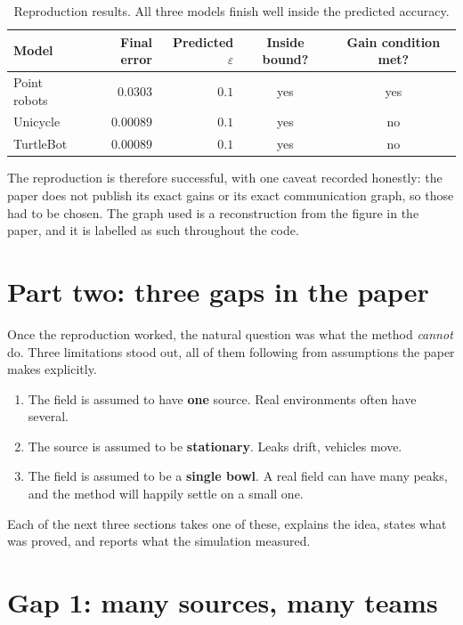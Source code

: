 \documentclass[11pt,a4paper]{article}
\begin{document}
\begin{table}[H]
\centering
\caption{Reproduction results. All three models finish well inside the predicted accuracy.}
\label{tab:baseline}
\small
\begin{tabular}{@{}lrrcc@{}}
\toprule
Model & Final error & Predicted $\varepsilon$ & Inside bound? & Gain condition met? \\
\midrule
Point robots & $0.0303$ & $0.1$ & yes & yes \\
Unicycle     & $0.00089$ & $0.1$ & yes & no \\
TurtleBot    & $0.00089$ & $0.1$ & yes & no \\
\bottomrule
\end{tabular}
\end{table}

The reproduction is therefore successful, with one caveat recorded honestly: the paper does not
publish its exact gains or its exact communication graph, so those had to be chosen. The graph used
is a reconstruction from the figure in the paper, and it is labelled as such throughout the code.

\section{Part two: three gaps in the paper}

Once the reproduction worked, the natural question was what the method \emph{cannot} do. Three
limitations stood out, all of them following from assumptions the paper makes explicitly.

\begin{enumerate}
    \item The field is assumed to have \textbf{one} source. Real environments often have several.
    \item The source is assumed to be \textbf{stationary}. Leaks drift, vehicles move.
    \item The field is assumed to be a \textbf{single bowl}. A real field can have many peaks, and
    the method will happily settle on a small one.
\end{enumerate}

Each of the next three sections takes one of these, explains the idea, states what was proved, and
reports what the simulation measured.

\section{Gap 1: many sources, many teams}
\end{document}

